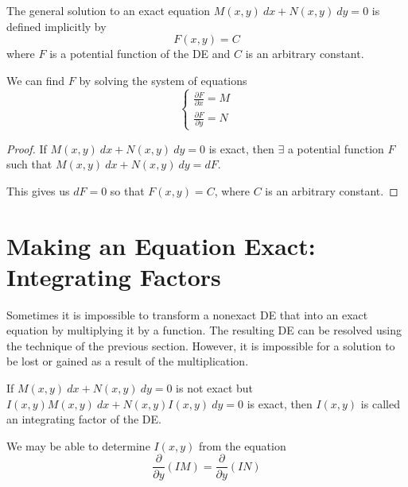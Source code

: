 \begin{theorem}
    The general solution to an exact equation $M(x,y)\>dx + N(x,y)\>dy = 0$ is 
    defined implicitly by 
    \begin{equation}
        F(x,y) = C
    \end{equation}
    where $F$ is a potential function of the DE and $C$ is an 
    arbitrary constant.
\end{theorem}
\begin{remark}
    We can find $F$ by solving the system of equations 
    \begin{equation}
        \begin{cases}
            \displaystyle 
            \frac{\partial F}{\partial x} = M\\[1em]
            \displaystyle 
            \frac{\partial F}{\partial y} = N
        \end{cases}
    \end{equation}
\end{remark}

\begin{proof}
    If $M(x,y)\>dx + N(x,y)\>dy = 0$ is exact, then $\exists$ a potential
    function $F$ such that $M(x,y)\>dx + N(x,y)\>dy = dF$.

    This gives us $dF = 0$ so that $F(x,y) = C$, where $C$ is an arbitrary 
    constant.
\end{proof}

\section{Making an Equation Exact: Integrating Factors}

Sometimes it is impossible to transform a nonexact DE that into an exact 
equation by multiplying it by a function. The resulting DE can be resolved using the technique
 of the previous section. However, it is impossible for a solution to be lost or gained as 
a result of the multiplication.

\begin{definition}
    If $M(x,y)\>dx + N(x,y)\>dy = 0$ is not exact but 
    $I(x,y)M(x,y)\>dx + N(x,y)I(x,y)\>dy = 0$ is exact, then $I(x,y)$ is called 
    an integrating factor of the DE.
\end{definition}
\begin{remark}
    We may be able to determine $I(x,y)$ from the equation 
    \begin{equation}
        \frac{\partial}{\partial y}(IM) = \frac{\partial}{\partial y}(IN)
    \end{equation}
\end{remark}

